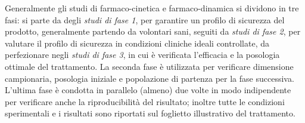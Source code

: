 \documentclass[a4page, twocolumn]{article}
\begin{document}
Generalmente gli studi di farmaco-cinetica e farmaco-dinamica si dividono in tre fasi: si parte da degli \textit{studi di fase 1}, per garantire un profilo di sicurezza del prodotto, generalmente partendo da volontari sani, seguiti da \textit{studi di fase 2}, per valutare il profilo di sicurezza in condizioni cliniche ideali controllate, da perfezionare negli \textit{studi di fase 3}, in cui è verificata l'efficacia e la posologia ottimale del trattamento.
La seconda fase è utilizzata per verificare dimensione campionaria, posologia iniziale e popolazione di partenza per la fase successiva.
L'ultima fase è condotta in parallelo (almeno) due volte in modo indipendente per verificare anche la riproducibilità del risultato; inoltre tutte le condizioni sperimentali e i risultati sono riportati sul foglietto illustrativo del trattamento.

%
%
%
%
\end{document}
